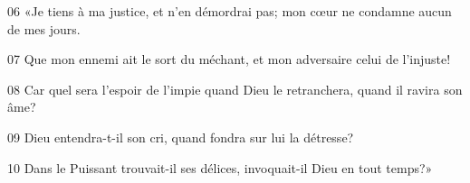 
06 «Je tiens à ma justice, et n’en démordrai pas; mon cœur ne condamne aucun de mes jours.

07 Que mon ennemi ait le sort du méchant, et mon adversaire celui de l’injuste!

08 Car quel sera l’espoir de l’impie quand Dieu le retranchera, quand il ravira son âme?

09 Dieu entendra-t-il son cri, quand fondra sur lui la détresse?

10 Dans le Puissant trouvait-il ses délices, invoquait-il Dieu en tout temps?»
